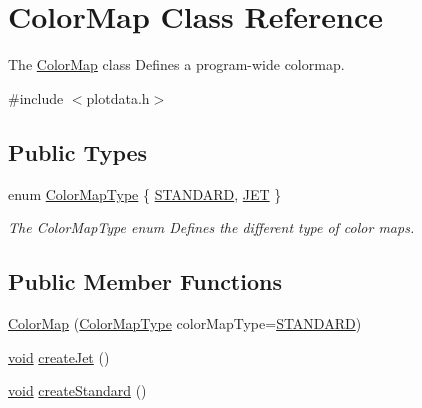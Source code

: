 \hypertarget{class_color_map}{\section{\-Color\-Map \-Class \-Reference}
\label{class_color_map}
}


\-The \hyperlink{class_color_map}{\-Color\-Map} class \-Defines a program-\/wide colormap.  




{\ttfamily \#include $<$plotdata.\-h$>$}

\subsection*{\-Public \-Types}
\begin{DoxyCompactItemize}
\item 
enum \hyperlink{group___scope_plugin_ga7f4f087196557757ec8061242e795031}{\-Color\-Map\-Type} \{ \hyperlink{group___scope_plugin_gga7f4f087196557757ec8061242e795031ada2d98ce081f031c9195188175d92d44}{\-S\-T\-A\-N\-D\-A\-R\-D}, 
\hyperlink{group___scope_plugin_gga7f4f087196557757ec8061242e795031a022cb7b62aaf4ea9c2c48375d4b187d8}{\-J\-E\-T}
 \}
\begin{DoxyCompactList}\small\item\em \-The \-Color\-Map\-Type enum \-Defines the different type of color maps. \end{DoxyCompactList}\end{DoxyCompactItemize}
\subsection*{\-Public \-Member \-Functions}
\begin{DoxyCompactItemize}
\item 
\hyperlink{group___scope_plugin_ga161e07946c9ab58fd04048a781700ff6}{\-Color\-Map} (\hyperlink{group___scope_plugin_ga7f4f087196557757ec8061242e795031}{\-Color\-Map\-Type} color\-Map\-Type=\hyperlink{group___scope_plugin_gga7f4f087196557757ec8061242e795031ada2d98ce081f031c9195188175d92d44}{\-S\-T\-A\-N\-D\-A\-R\-D})
\item 
\hyperlink{group___u_a_v_objects_plugin_ga444cf2ff3f0ecbe028adce838d373f5c}{void} \hyperlink{group___scope_plugin_ga040b747e27af88d72ffee08958e26e1c}{create\-Jet} ()
\item 
\hyperlink{group___u_a_v_objects_plugin_ga444cf2ff3f0ecbe028adce838d373f5c}{void} \hyperlink{group___scope_plugin_ga1900e4d813aed6169f83d1d83c3746e3}{create\-Standard} ()
\end{DoxyCompactItemize}



